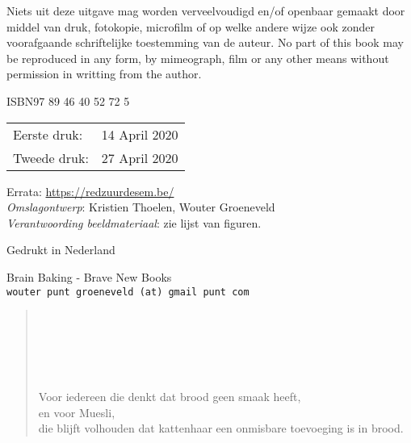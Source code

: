 Niets uit deze uitgave mag worden verveelvoudigd en/of openbaar gemaakt door middel van druk, fotokopie, microfilm of op welke andere wijze ook zonder voorafgaande schriftelijke toestemming van de auteur. \newline
No part of this book may be reproduced in any form, by mimeograph, film or any other means without permission in writting from the author. 

\begin{center}
 ISBN\hspace{2em}97 89 46 40 52 72 5
\end{center}

\begin{center}
\begin{tabular}{ll}
Eerste druk:  & 14 April 2020 \\
Tweede druk:  & 27 April 2020 \\
\end{tabular}
\end{center}

\vfill

Errata: \url{https://redzuurdesem.be/} \\

\hspace*{2em} \textit{Omslagontwerp}: Kristien Thoelen, Wouter Groeneveld \\
\hspace*{2em} \textit{Verantwoording beeldmateriaal}: zie lijst van figuren. \\

\vfill

Gedrukt in Nederland

Brain Baking - Brave New Books \\
\texttt{wouter punt groeneveld (at) gmail punt com}

\vspace*{2\baselineskip}
\clearpage


 \newenvironment{dedication}
     {\vspace{6ex}\begin{quotation}\begin{center}\begin{em}}
     {\par\end{em}\end{center}\end{quotation}}

\begin{dedication}
  ~\\
  ~\\
  ~\\
  ~\\
  ~\\
	Voor iedereen die denkt dat brood geen smaak heeft, \\
	en voor Muesli, \\
  die blijft volhouden dat kattenhaar een onmisbare toevoeging is in brood. 
\end{dedication}

\endgroup
\clearpage


\pagestyle{empty}

\renewcommand*\contentsname{Inhoudsopgave}
{
  \setcounter{tocdepth}{2}
  \tableofcontents*
}

\clearpage
\pagestyle{desem}

